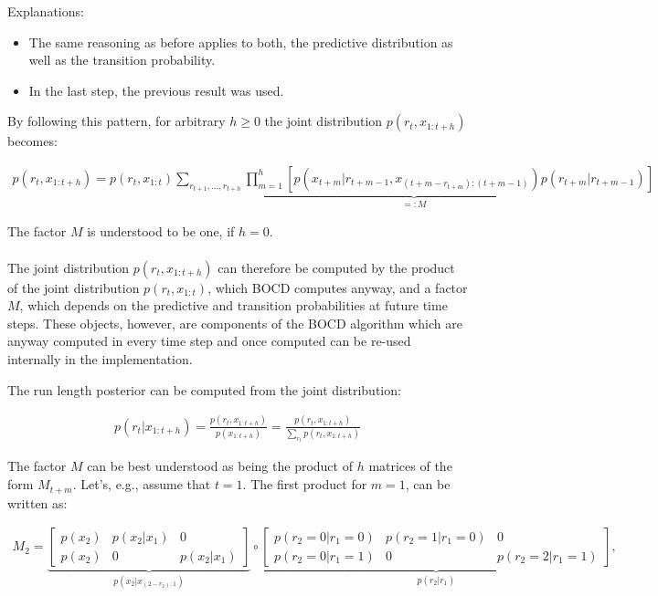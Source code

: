 \documentclass{article}
\begin{document}
Explanations:
\begin{itemize}
    \item The same reasoning as before applies to both, the predictive distribution as well as the transition probability.
    \item In the last step, the previous result was used.
\end{itemize}

By following this pattern, for arbitrary $h\geq0$ the joint distribution $p\left(r_{t},x_{1:t+h}\right)$ becomes:

\begin{align}
p(r_{t},x_{1:t+h})=p(r_{t},x_{1:t})\underbrace{\sum_{r_{t+1},...,r_{t+h}}\prod_{m=1}^{h}\left[p(x_{t+m}\vert r_{t+m-1},x_{(t+m-r_{t+m}):\left(t+m-1\right)})p(r_{t+m}\vert r_{t+m-1})\right]}_{=:M}
\end{align}

The factor $M$ is understood to be one, if $h=0$.\\\\

The joint distribution $p\left(r_{t},x_{1:t+h}\right)$ can therefore be computed by the product of the joint distribution $p(r_{t},x_{1:t})$, which BOCD computes anyway, and a factor  $M$, which depends on the predictive and transition probabilities at future time steps. These objects, however, are components of the BOCD algorithm which are anyway computed in every time step and once computed can be re-used internally in the implementation.

The run length posterior can be computed from the joint distribution:

\begin{align}
p(r_{t}\vert x_{1:t+h})=\frac{p(r_{t},x_{1:t+h})}{p(x_{1:t+h})}=\frac{p(r_{t},x_{1:t+h})}{\sum_{r_{t}}p(r_{t},x_{1:t+h})}
\end{align}

The factor $M$ can be best understood as being the product of $h$ matrices of the form $M_{t+m}$. Let's, e.g., assume that $t=1$. The first product for $m=1$, can be written as:

\begin{align}
M_{2}=\underbrace{\left[\begin{array}{ccc}
p(x_{2}) & p(x_{2}\vert x_{1}) & 0\\
p(x_{2}) & 0 & p(x_{2}\vert x_{1})
\end{array}\right]}_{p(x_{2}\vert x_{(2-r_{2}):1})}\circ\underbrace{\left[\begin{array}{ccc}
p(r_{2}=0\vert r_{1}=0) & p(r_{2}=1\vert r_{1}=0) & 0\\
p(r_{2}=0\vert r_{1}=1) & 0 & p(r_{2}=2\vert r_{1}=1)
\end{array}\right]}_{p(r_{2}\vert r_{1})},
\end{align}
\end{document}
